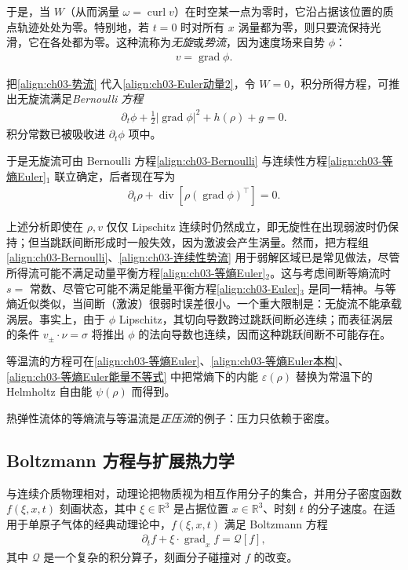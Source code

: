 ﻿\documentclass[../../main.tex]{subfiles}
\begin{document}
于是，当 $W$（从而涡量 $\omega=\operatorname{curl}v$）在时空某一点为零时，它沿占据该位置的质点轨迹处处为零。特别地，若 $t=0$ 时对所有 $x$ 涡量都为零，则只要流保持光滑，它在各处都为零。这种流称为\emph{无旋}或\emph{势流}，因为速度场来自势 $\phi$：
\begin{align}
v=\operatorname{grad}\phi.
\label{align:ch03-势流}
\end{align}

把\eqref{align:ch03-势流} 代入\eqref{align:ch03-Euler动量2}，令 $W=0$，积分所得方程，可推出无旋流满足\emph{Bernoulli 方程}
\begin{align}
\partial_{t}\phi+\frac{1}{2}|\operatorname{grad}\phi|^{2}+h(\rho)+g=0.
\label{align:ch03-Bernoulli}
\end{align}
积分常数已被吸收进 $\partial_{t}\phi$ 项中。

于是无旋流可由 Bernoulli 方程\eqref{align:ch03-Bernoulli} 与连续性方程\eqref{align:ch03-等熵Euler}$_{1}$ 联立确定，后者现在写为
\begin{align}
\partial_{t}\rho+\operatorname{div}\left[\rho(\operatorname{grad}\phi)^{\top}\right]=0.
\label{align:ch03-连续性势流}
\end{align}

上述分析即使在 $\rho,v$ 仅仅 Lipschitz 连续时仍然成立，即无旋性在出现弱波时仍保持；但当跳跃间断形成时一般失效，因为激波会产生涡量。然而，把方程组\eqref{align:ch03-Bernoulli}、\eqref{align:ch03-连续性势流} 用于弱解区域已是常见做法，尽管所得流可能不满足动量平衡方程\eqref{align:ch03-等熵Euler}$_{2}$。这与考虑间断等熵流时 $s=$ 常数、尽管它可能不满足能量平衡方程\eqref{align:ch03-Euler}$_{3}$ 是同一精神。与等熵近似类似，当间断（激波）很弱时误差很小。一个重大限制是：无旋流不能承载涡层。事实上，由于 $\phi$ Lipschitz，其切向导数跨过跳跃间断必连续；而表征涡层的条件 $v_{\pm}\cdot\nu=\sigma$ 将推出 $\phi$ 的法向导数也连续，因而这种跳跃间断不可能存在。

等温流的方程可在\eqref{align:ch03-等熵Euler}、\eqref{align:ch03-等熵Euler本构}、\eqref{align:ch03-等熵Euler能量不等式} 中把常熵下的内能 $\varepsilon(\rho)$ 替换为常温下的 Helmholtz 自由能 $\psi(\rho)$ 而得到。

热弹性流体的等熵流与等温流是\emph{正压流}的例子：压力只依赖于密度。

\subsection{Boltzmann 方程与扩展热力学}\label{subsection:ch03-Boltzmann}

与连续介质物理相对，动理论把物质视为相互作用分子的集合，并用分子密度函数 $f(\xi,x,t)$ 刻画状态，其中 $\xi\in\mathbb{R}^{3}$ 是占据位置 $x\in\mathbb{R}^{3}$、时刻 $t$ 的分子速度。在适用于单原子气体的经典动理论中，$f(\xi,x,t)$ 满足 Boltzmann 方程
\begin{align}
\partial_{t}f+\xi\cdot\operatorname{grad}_{x}f=\mathcal{Q}[f],
\label{align:ch03-Boltzmann}
\end{align}
其中 $\mathcal{Q}$ 是一个复杂的积分算子，刻画分子碰撞对 $f$ 的改变。
\end{document}
